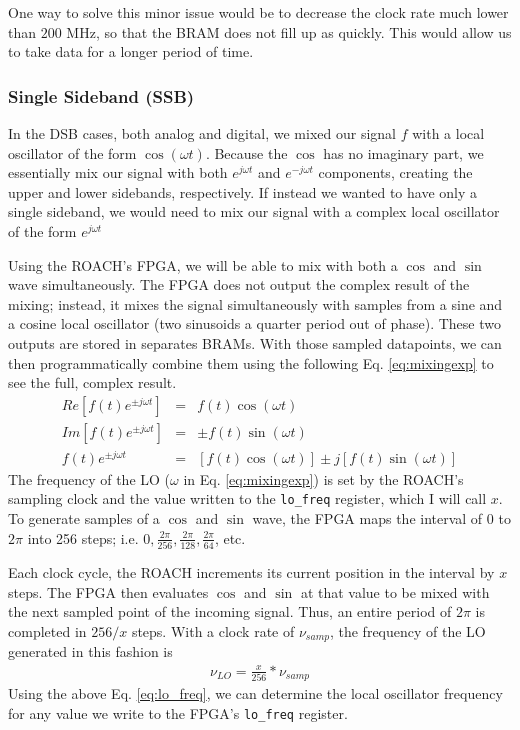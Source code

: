 \documentclass[12pt]{article}
\begin{document}
One way to solve this minor issue would be to decrease the clock rate much lower than $200$ MHz, so that the BRAM does not fill up as quickly. This would allow us to take data for a longer period of time.



\subsubsection{Single Sideband (SSB)}
In the DSB cases, both analog and digital, we mixed our signal $f$ with a local oscillator of the form $\cos(\omega t)$. Because the $\cos$ has no imaginary part, we essentially mix our signal with both $e^{j \omega t}$ and $e^{-j \omega t}$ components, creating the upper and lower sidebands, respectively. If instead we wanted to have only a single sideband, we would need to mix our signal with a complex local oscillator of the form $e^{j \omega t}$

Using the ROACH's FPGA, we will be able to mix with both a $\cos$ and $\sin$ wave simultaneously. The FPGA does not output the complex result of the mixing; instead, it mixes the signal simultaneously with samples from a sine and a cosine local oscillator (two sinusoids a quarter period out of phase). These two outputs are stored in separates BRAMs. With those sampled datapoints, we can then programmatically combine them using the following Eq. \ref{eq:mixingexp} to see the full, complex result.
\begin{eqnarray}
Re[f(t) e^{\pm j\omega t}] &=& f(t) \cos(\omega t)\nonumber\\
Im[f(t) e^{\pm j\omega t}] &=& \pm f(t) \sin(\omega t) \nonumber\\
f(t) e^{\pm j\omega t} &=& [f(t) \cos(\omega t)] \pm j [f(t) \sin(\omega t)] \label{eq:mixingexp}
\end{eqnarray}
The frequency of the LO ($\omega$ in Eq. \ref{eq:mixingexp}) is set by the ROACH's sampling clock and the value written to the \texttt{lo\_freq} register, which I will call $x$. To generate samples of a $\cos$ and $\sin$ wave, the FPGA maps the interval of $0$ to $2\pi$ into 256 steps; i.e. $0, \frac{2\pi}{256}, \frac{2\pi}{128}, \frac{2\pi}{64}$, etc. 

Each clock cycle, the ROACH increments its current position in the interval by $x$ steps. The FPGA then evaluates $\cos$ and $\sin$ at that value to be mixed with the next sampled point of the incoming signal. Thus, an entire period of $2\pi$ is completed in $256/x$ steps. With a clock rate of $\nu_{samp}$, the frequency of the LO generated in this fashion is
\begin{eqnarray}
\nu_{LO} = \frac{x}{256} * \nu_{samp} \label{eq:lo_freq}
\end{eqnarray}
Using the above Eq. \ref{eq:lo_freq}, we can determine the local oscillator frequency for any value we write to the FPGA's \texttt{lo\_freq} register.
\end{document}

